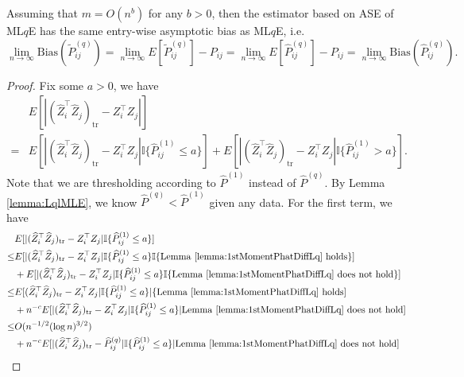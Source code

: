 \begin{lemma}
\label{lm:LqConsistentproof}
Assuming that $m = O(n^b)$ for any $b > 0$, then the estimator based on ASE of ML$q$E has the same entry-wise asymptotic bias as ML$q$E, i.e.\
\[
	\lim_{n \to \infty} \mathrm{Bias}(\widetilde{P}_{ij}^{(q)}) = \lim_{n \to \infty} E[\widetilde{P}_{ij}^{(q)}] - P_{ij} = \lim_{n \to \infty} E[\hat{P}^{(q)}_{ij}] - P_{ij}
    = \lim_{n \to \infty} \mathrm{Bias}(\hat{P}_{ij}^{(q)}).
\]
\end{lemma}
\begin{proof}
Fix some $a > 0$, we have
\begin{align*}
	& E[|(\hat{Z}_i^{\top} \hat{Z}_j)_{\mathrm{tr}} - Z_i^{\top} Z_j|] \\
	= & E[|(\hat{Z}_i^{\top} \hat{Z}_j)_{\mathrm{tr}} - Z_i^{\top} Z_j| \mathbb{I}\{\hat{P}^{(1)}_{ij} \le a\}]
	+ E[|(\hat{Z}_i^{\top} \hat{Z}_j)_{\mathrm{tr}} - Z_i^{\top} Z_j| \mathbb{I}\{\hat{P}^{(1)}_{ij} > a\}].
\end{align*}
Note that we are thresholding according to $\hat{P}^{(1)}$ instead of $\hat{P}^{(q)}$. By Lemma \ref{lemma:LqlMLE}, we know $\hat{P}^{(q)} < \hat{P}^{(1)}$ given any data.
For the first term, we have
\begin{align*}
	& E[|(\hat{Z}_i^{\top} \hat{Z}_j)_{\mathrm{tr}} - Z_i^{\top} Z_j| \mathbb{I}\{\hat{P}^{(1)}_{ij} \le a\}] \\
	\le & E[|(\hat{Z}_i^{\top} \hat{Z}_j)_{\mathrm{tr}} - Z_i^{\top} Z_j| \mathbb{I}\{\hat{P}^{(1)}_{ij} \le a\} \mathbb{I}\{\mathrm{Lemma\ } \ref{lemma:1stMomentPhatDiffLq} \mathrm{\ holds}\}] \\
	& + E[|(\hat{Z}_i^{\top} \hat{Z}_j)_{\mathrm{tr}} - Z_i^{\top} Z_j| \mathbb{I}\{\hat{P}^{(1)}_{ij} \le a\} \mathbb{I}\{\mathrm{Lemma\ } \ref{lemma:1stMomentPhatDiffLq} \mathrm{\ does\ not\ hold}\}] \\
	\le & E[(\hat{Z}_i^{\top} \hat{Z}_j)_{\mathrm{tr}} - Z_i^{\top} Z_j| \mathbb{I}\{\hat{P}^{(1)}_{ij} \le a\} |\{\mathrm{Lemma\ } \ref{lemma:1stMomentPhatDiffLq} \mathrm{\ holds}] \\
	& + n^{-c} E[|(\hat{Z}_i^{\top} \hat{Z}_j)_{\mathrm{tr}} - Z_i^{\top} Z_j| \mathbb{I}\{\hat{P}^{(1)}_{ij} \le a\} | \mathrm{Lemma\ } \ref{lemma:1stMomentPhatDiffLq} \mathrm{\ does\ not\ hold}] \\
	\le & O(n^{-1/2} (\log n)^{3/2}) \\
	& + n^{-c} E[|(\hat{Z}_i^{\top} \hat{Z}_j)_{\mathrm{tr}} - \hat{P}^{(q)}_{ij}| \mathbb{I}\{\hat{P}^{(1)}_{ij} \le a\} | \mathrm{Lemma\ } \ref{lemma:1stMomentPhatDiffLq} \mathrm{\ does\ not\ hold}] \\

\end{align*}
\end{proof}

